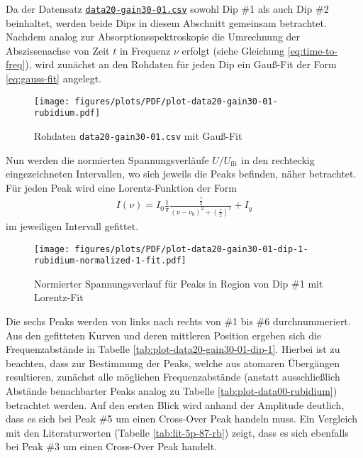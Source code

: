 Da der Datensatz \href{https://github.com/DaHaCoder/H2-Auswertung/blob/main/data/data20-gain30-01.csv}{\lstinline{data20-gain30-01.csv}} sowohl Dip \textcolor{red!80!black}{\#1} als auch Dip \textcolor{green!50!black}{\#2} beinhaltet, werden beide Dips in diesem Abschnitt gemeinsam betrachtet.
Nachdem analog zur Absorptionsspektroskopie die Umrechnung der Abszissenachse von Zeit $t$ in Frequenz $\nu$ erfolgt (siehe Gleichung \eqref{eq:time-to-freq}), wird zunächst an den Rohdaten für jeden Dip ein Gauß-Fit der Form \eqref{eq:gauss-fit} angelegt. 

\begin{figure}[!h]
    \centering
    \texttt{[image: figures/plots/PDF/plot-data20-gain30-01-rubidium.pdf]}
    \caption{Rohdaten \lstinline{data20-gain30-01.csv} mit Gauß-Fit}
    \label{fig:plot-data20-gain30-01-rubidium}
\end{figure}

\noindent Nun werden die normierten Spannungsverläufe $U/U_{\text{fit}}$ in den rechteckig eingezeichneten Intervallen, wo sich jeweils die Peaks befinden, näher betrachtet. Für jeden Peak wird eine Lorentz-Funktion der Form
\begin{align}
    I(\nu) = I_{0} \frac{1}{\pi} \frac{\frac{\gamma}{2}}{ (\nu - \nu_{0})^2 + (\frac{\gamma}{2})^2} + I_{y}
    \label{eq:lorentz-fit}
\end{align}
im jeweiligen Intervall gefittet.

\begin{figure}[H]
    \centering
    \texttt{[image: figures/plots/PDF/plot-data20-gain30-01-dip-1-rubidium-normalized-1-fit.pdf]}
    \caption{Normierter Spannungsverlauf für Peaks in Region von Dip \textcolor{red!80!black}{\#1} mit Lorentz-Fit}
    \label{fig:plot-data20-gain30-01-dip-1-rubidium-normalized-1-fit}
\end{figure}

\noindent Die sechs Peaks werden von links nach rechts von \#1 bis \#6 durchnummeriert. Aus den gefitteten Kurven und deren mittleren Position ergeben sich die Frequenzabstände in Tabelle \ref{tab:plot-data20-gain30-01-dip-1}.
Hierbei ist zu beachten, dass zur Bestimmung der Peaks, welche aus atomaren Übergängen resultieren, zunächst alle möglichen Frequenzabstände (anstatt ausschließlich Abstände benachbarter Peaks analog zu Tabelle \ref{tab:plot-data00-rubidium}) betrachtet werden. Auf den ersten Blick wird anhand der Amplitude deutlich, dass es sich bei Peak \#5 um einen Cross-Over Peak handeln muss. Ein Vergleich mit den Literaturwerten (Tabelle \ref{tab:lit-5p-87-rb}) zeigt, dass es sich ebenfalls bei Peak \#3 um einen Cross-Over Peak handelt. 

